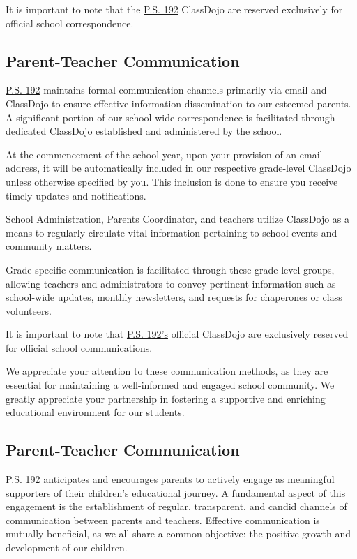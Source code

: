 \documentclass[11pt, letterpaper]{article}
\begin{document}
It is important to note that the \href{https://www.ps192.org}{P.S. 192} ClassDojo are reserved exclusively for official school correspondence.

\subsection{Parent-Teacher Communication} 
\href{https://www.ps192.org}{P.S. 192} maintains formal communication channels primarily via email and ClassDojo to ensure effective information dissemination to our esteemed parents. A significant portion of our school-wide correspondence is facilitated through dedicated ClassDojo established and administered by the school.

At the commencement of the school year, upon your provision of an email address, it will be automatically included in our respective grade-level ClassDojo unless otherwise specified by you. This inclusion is done to ensure you receive timely updates and notifications.

School Administration, Parents Coordinator, and teachers utilize ClassDojo as a means to regularly circulate vital information pertaining to school events and community matters.

Grade-specific communication is facilitated through these grade level groups, allowing teachers and administrators to convey pertinent information such as school-wide updates, monthly newsletters, and requests for chaperones or class volunteers.

It is important to note that \href{https://www.ps192.org}{P.S. 192's} official ClassDojo are exclusively reserved for official school communications.

We appreciate your attention to these communication methods, as they are essential for maintaining a well-informed and engaged school community. We greatly appreciate your partnership in fostering a supportive and enriching educational environment for our students.
\subsection{Parent-Teacher Communication}
\href{https://www.ps192.org}{P.S. 192} anticipates and encourages parents to actively engage as meaningful supporters of their children's educational journey. A fundamental aspect of this engagement is the establishment of regular, transparent, and candid channels of communication between parents and teachers. Effective communication is mutually beneficial, as we all share a common objective: the positive growth and development of our children.
\end{document}

